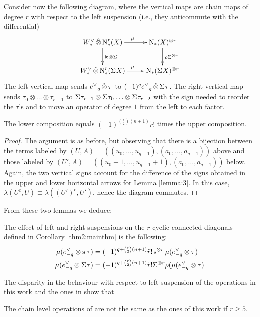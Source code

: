 Consider now the following diagram, where the vertical maps are chain maps of degree $r$ with respect to the left suspension (i.e., they anticommute with the differential)
\[
\xymatrix{
	\Wd\hotimes \rchains(X)\ar[r]^{\mu}\ar[d]^{\id\otimes \susp{r}} & \chains(X)^{\otimes r} \ar[d]^{\rho\susp{\otimes r}}
	\\
	\Wd\hotimes \rchains(\susp{} X)\ar[r]^{\mu} & \chains(\susp{}X)^{\otimes r}	
}
\]
The left vertical map sends $e_{-q}^\vee\operatorname{\hat{\otimes}} \tau$ to $(-1)^{q}e_{-q}^\vee\operatorname{\hat{\otimes}} \Sigma^{}\tau$. The right vertical map sends $\tau_0\otimes \ldots\otimes \tau_{r-1}$ to $\Sigma^{}\tau_{r-1}\otimes \Sigma^{}\tau_0\ldots\otimes \Sigma^{}\tau_{r-2}$ with the sign needed to reorder the $\tau$'s and to move an operator of degree $1$ from the left to each factor. 
\begin{lemma}
	The lower composition equals $(-1)^{\binom{r}{2}(n+1)}\tilde{r}!$ times the upper composition.
\end{lemma}
\begin{proof}
	The argument is as before, but observing that there is a bijection between the terms labeled by $(U,A) = ((u_0,\ldots,u_{q-1}),(a_0,\ldots,a_{q-1}))$ above and those labeled by $(U',A) = ((u_0+1,\ldots,u_{q-1}+1),(a_0,\ldots,a_{q-1}))$ below. Again, the two vertical signs account for the difference of the signs obtained in the upper and lower horizontal arrows for Lemma \ref{lemma:3}. In this case, $\lambda(U^c,U) \equiv \lambda((U')^c,U')$, hence the diagram commutes. 
\end{proof}
From these two lemmas we deduce:
\begin{proposition}\label{prop:suspensionconnected}
 The effect of left and right suspensions on the $r$-cyclic connected diagonals defined in Corollary \ref{thm2:mainthm} is the following:
 \begin{align*}
  \mu(e_{-q}^\vee \otimes \operatorname{s}^{}\tau) &= (-1)^{q + \binom{r}{2}(n+1)}\tilde{r}!\operatorname{s}^{\otimes r}\mu(e_{-q}^\vee \otimes \tau)
  \\
 \mu(e_{-q}^\vee \otimes \Sigma^{}\tau) &= (-1)^{q + \binom{r}{2}(n+1)}\tilde{r}!\Sigma^{\otimes r}\rho (\mu(e_{-q}^\vee \otimes \tau) 
 \end{align*}
\end{proposition}


The disparity in the behaviour with respect to left suspension of the operations in this work and the ones in \cite{medina2021may_st} show that
\begin{corollary}
	The chain level operations of \cite{medina2021may_st} are not the same as the ones of this work if $r\geq 5$.
\end{corollary}


